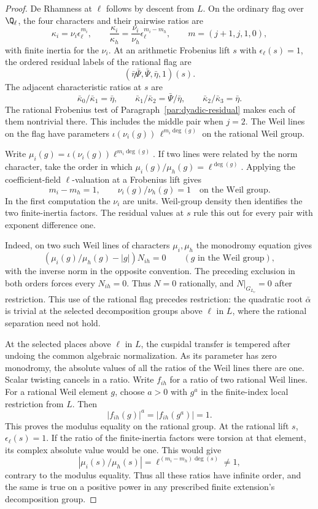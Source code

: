 \begin{proof}
De Rhamness at \(\ell\) follows by descent from \(L\).
On the ordinary flag over \(\Q_\ell\), the four characters and their pairwise ratios are
\[
 \kappa_i=\nu_i\epsilon_\ell^{m_i},\qquad
 \frac{\kappa_i}{\kappa_h}=\frac{\nu_i}{\nu_h}\epsilon_\ell^{m_i-m_h},
 \qquad m=(j+1,j,1,0),
\]
with finite inertia for the \(\nu_i\). At an arithmetic Frobenius lift \(s\) with
\(\epsilon_\ell(s)=1\), the ordered residual labels
of the rational flag are
\[
                 (\bar\eta\bar\Psi,\bar\Psi,\bar\eta,1)(s).
\]
The adjacent characteristic ratios at \(s\) are
\[
 \bar\kappa_0/\bar\kappa_1=\bar\eta,\qquad
 \bar\kappa_1/\bar\kappa_2=\bar\Psi/\bar\eta,\qquad
 \bar\kappa_2/\bar\kappa_3=\bar\eta .
\]
The rational Frobenius test of Paragraph~\ref{par:dyadic-residual}
makes each of them nontrivial there.
This includes the middle pair when \(j=2\).
The Weil lines on the flag have parameters
\(\iota(\nu_i(g))\,\ell^{m_i\deg(g)}\) on the rational
Weil group.

Write \(\mu_i(g)=\iota(\nu_i(g))\ell^{m_i\deg(g)}\).
If two lines were related by the norm character, take the
order in which \(\mu_i(g)/\mu_h(g)=\ell^{\deg(g)}\).
Applying the coefficient-field \(\ell\)-valuation at a
Frobenius lift gives
\[
       m_i-m_h=1,\qquad
       \nu_i(g)/\nu_h(g)=1\quad\text{on the Weil group}.
\]
In the first computation the \(\nu_i\) are units. Weil-group
density then identifies the two finite-inertia factors. The residual values at \(s\) rule this out
for every pair with exponent difference one.

Indeed, on two such Weil lines of characters \(\mu_i,\mu_h\) the monodromy equation gives
\[
 (\mu_i(g)/\mu_h(g)-|g|)N_{ih}=0\qquad(g\text{ in the Weil group}),
\]
with the inverse norm in the opposite convention. The preceding exclusion in both orders forces every \(N_{ih}=0\).
Thus \(N=0\) rationally, and \(N|_{G_{L_v}}=0\) after restriction.
This use of the rational flag precedes restriction:
the quadratic root \(\bar\alpha\) is trivial at the
selected decomposition groups above \(\ell\) in \(L\),
where the rational separation need not hold.
\cite{colmez-fontaine}\label{cor:ordinary-count-iii-point-output-1}

At the selected places above \(\ell\) in \(L\), the
cuspidal transfer is tempered after undoing the common
algebraic normalization. As its parameter has zero
monodromy, the absolute values of all the ratios of
the Weil lines there are one. Scalar twisting cancels
in a ratio. Write \(f_{ih}\) for a ratio of two rational Weil lines.
For a rational Weil element \(g\), choose \(a>0\) with
\(g^a\) in the finite-index local restriction from \(L\).
Then
\[
                         |f_{ih}(g)|^a=|f_{ih}(g^a)|=1 .
\]
This proves the modulus equality on the rational group.
At the rational lift \(s\), \(\epsilon_\ell(s)=1\).
If the ratio of the finite-inertia factors were torsion at that
element, its complex absolute value would be one. This would give
\[
       |\mu_i(s)/\mu_h(s)|=\ell^{(m_i-m_h)\deg(s)}\ne1,
\]
contrary to the modulus equality.
Thus all these ratios have infinite order, and the same
is true on a positive power in any prescribed finite
extension's decomposition group.


\end{proof}
